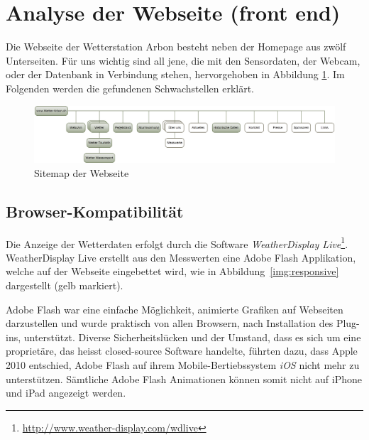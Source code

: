 \section{Analyse der Webseite (front end)}

Die Webseite der Wetterstation Arbon besteht neben der Homepage aus zwölf Unterseiten. Für uns wichtig sind all jene, die mit den Sensordaten, der Webcam, oder der Datenbank in Verbindung stehen, hervorgehoben in Abbildung \ref{img:sitemap}. Im Folgenden werden die gefundenen Schwachstellen erklärt.

\begin{figure}[h!]
	\centering
	\includegraphics[width=0.9\linewidth]{img/sitemap2}
	\caption{Sitemap der Webseite}
	\label{img:sitemap}
\end{figure}


\subsection{Browser-Kompatibilität}
\label{subsec:flash}
Die Anzeige der Wetterdaten erfolgt durch die Software \textit{WeatherDisplay Live}\footnote{ \url{http://www.weather-display.com/wdlive}}. WeatherDisplay Live erstellt aus den Messwerten eine Adobe Flash Applikation, welche auf der Webseite eingebettet wird, wie in Abbildung~\ref{img:responsive} dargestellt (gelb markiert).
\newline

\noindent
Adobe Flash war eine einfache Möglichkeit, animierte Grafiken auf Webseiten darzustellen und wurde praktisch von allen Browsern, nach Installation des Plug-ins, unterstützt. Diverse Sicherheitslücken und der Umstand, dass es sich um eine proprietäre, das heisst closed-source Software handelte, führten dazu, dass Apple 2010 entschied, Adobe Flash auf ihrem Mobile-Bertiebssystem \textit{iOS} nicht mehr zu unterstützen\cite{Apple:ThoughtsOnFlash}. Sämtliche Adobe Flash Animationen können somit nicht auf iPhone und iPad angezeigt werden.

